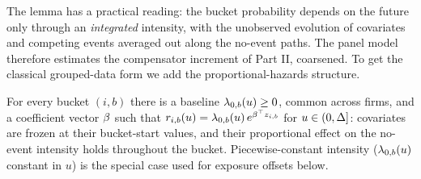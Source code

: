 The lemma has a practical reading: the bucket probability
depends on the future only through an \emph{integrated} intensity, with
the unobserved evolution of covariates and competing events averaged out
along the no-event paths. The panel model therefore estimates the
compensator increment of Part II, coarsened.
To get the classical grouped-data form we add the proportional-hazards
structure.

\begin{assumption}\label{asm:ch09:groupedph}
For every bucket $(i,b)$ there is a baseline $\lambda_{0,b}(u) \ge 0$,
common across firms, and a coefficient vector $\beta$ such that
$r_{i,b}(u) = \lambda_{0,b}(u)\, e^{\beta^{\top} z_{i,b}}$ for
$u \in (0,\Delta]$: covariates are frozen at their bucket-start values,
and their proportional effect on the no-event intensity holds throughout
the bucket. Piecewise-constant intensity ($\lambda_{0,b}(u)$ constant in
$u$) is the special case used for exposure offsets below.
\end{assumption}

